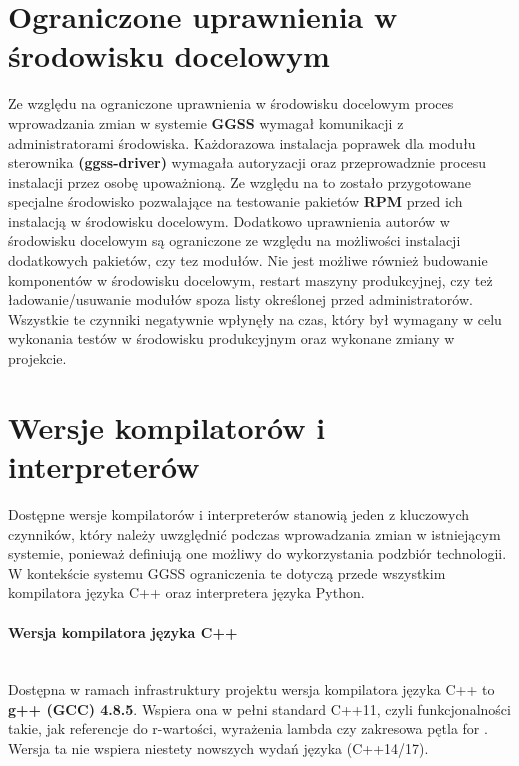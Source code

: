 \section{Ograniczone uprawnienia w środowisku docelowym}
Ze względu na ograniczone uprawnienia w środowisku docelowym proces wprowadzania zmian w systemie \textbf{GGSS} wymagał komunikacji z administratorami środowiska. Każdorazowa instalacja poprawek dla modułu sterownika \textbf{(ggss-driver)} wymagała autoryzacji oraz przeprowadznie procesu instalacji przez osobę upoważnioną. Ze względu na to zostało przygotowane specjalne środowisko pozwalające na testowanie pakietów \textbf{RPM} przed ich instalacją w środowisku docelowym. Dodatkowo uprawnienia autorów w środowisku docelowym są ograniczone ze względu na możliwości instalacji dodatkowych pakietów, czy tez modułów. Nie jest możliwe również budowanie komponentów w środowisku docelowym, restart maszyny produkcyjnej, czy też ładowanie/usuwanie modułów spoza listy określonej przed administratorów. Wszystkie te czynniki negatywnie wpłynęły na czas, który był wymagany w celu wykonania testów w środowisku produkcyjnym oraz wykonane zmiany w projekcie.


\section{Wersje kompilatorów i interpreterów}
Dostępne wersje kompilatorów i interpreterów stanowią jeden z kluczowych czynników, który należy uwzględnić podczas wprowadzania zmian w istniejącym systemie, ponieważ definiują one możliwy do wykorzystania podzbiór technologii. W kontekście systemu GGSS ograniczenia te dotyczą przede wszystkim kompilatora języka C++ oraz interpretera języka Python. 

\paragraph*{Wersja kompilatora języka C++}\mbox{}\\
Dostępna w ramach infrastruktury projektu wersja kompilatora języka C++ to \textbf{g++ (GCC) 4.8.5}. Wspiera ona w pełni standard C++11, czyli funkcjonalności takie, jak referencje do r-wartości, wyrażenia lambda czy zakresowa pętla for \cite{GCC48}. Wersja ta nie wspiera niestety nowszych wydań języka (C++14/17).

